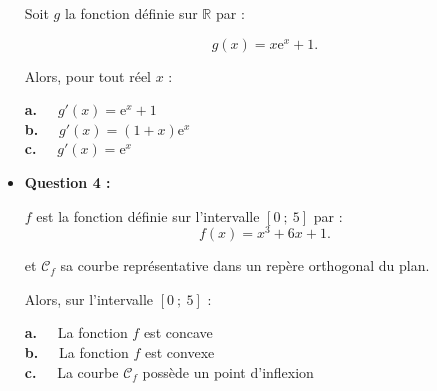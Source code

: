 \begin{itemize}
     Soit $g$ la fonction définie sur $\mathbb{R}$ par :
     \par
     \[ g(x)=x \text{e}^{x}+1. \]
     \par
     Alors, pour tout réel $x$ :
     \par
     \textbf{a.~~} $g'(x)=\text{e}^{x}+1$ \\
     \textbf{b.~~} $g'(x)=(1+x)\text{e}^{x}$  \\
     \textbf{c.~~} $g'(x)=\text{e}^{x}$ \\
\medskip
     \item \textbf{Question 4 :}
     \par
     $f$ est la fonction définie sur l'intervalle $[0~;~5]$ par :
     \[ f(x)=x^3+6x+1. \]
     \par
     et $\mathscr{C}_f$ sa courbe représentative dans un repère orthogonal du plan.
     \par
     Alors, sur l'intervalle $[0~;~5]$  :
     \par
     \textbf{a.~~} La fonction $f$ est concave \\
     \textbf{b.~~} La fonction $f$ est convexe \\
     \textbf{c.~~} La courbe $\mathscr{C}_f$ possède un point d'inflexion \\
     \par
\end{itemize}
